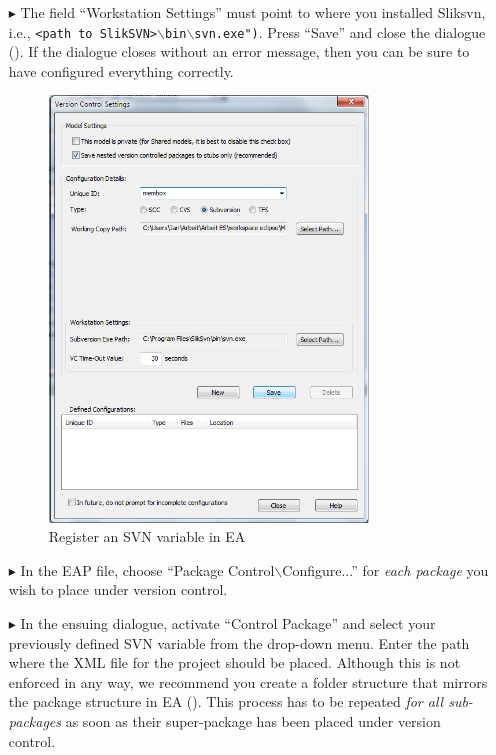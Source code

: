 \begin{enumerate}
  \item[$\blacktriangleright$] The field ``Workstation Settings'' must point to where you installed Sliksvn, i.e., \texttt{<path to
  SlikSVN>$\backslash$bin$\backslash$svn.exe")}. Press ``Save'' and close the dialogue (). If the dialogue closes
  without an error message, then you can be sure to have configured everything correctly.

\begin{figure}[!htbp]
\begin{center}
	\includegraphics[width=0.8\textwidth]{versioncontrol}
	\caption{Register an SVN variable in EA}
  	\label{fig:advanced-topics-eaSVN-variable}
\end{center}
\end{figure}

\item[$\blacktriangleright$] In the EAP file, choose ``Package Control$\backslash$Configure...'' for \emph{each package} you wish to place under version control.

\item[$\blacktriangleright$] In the ensuing dialogue, activate ``Control Package'' and select your previously defined SVN variable from the drop-down menu.
Enter the path where the XML file for the project should be placed. Although this is not enforced in any way, we recommend you create a folder structure that
mirrors the package structure in EA (). This process has to be repeated \emph{for all sub-packages} as soon as
their super-package has been placed under version control.


\end{enumerate}
